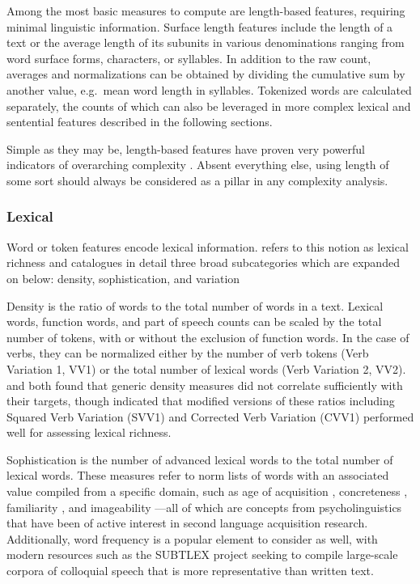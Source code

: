 Among the most basic measures to compute are length-based features, requiring minimal linguistic information. Surface length features include the length of a text or the average length of its subunits in various denominations ranging from word surface forms, characters, or syllables. In addition to the raw count, averages and normalizations can be obtained by dividing the cumulative sum by another value, e.g.\ mean word length in syllables. Tokenized words are calculated separately, the counts of which can also be leveraged in more complex lexical and sentential features described in the following sections.

Simple as they may be, length-based features have proven very powerful indicators of overarching complexity \citep{norris2009, bulte2012}. Absent everything else, using length of some sort should always be considered as a pillar in any complexity analysis.

\subsubsection{Lexical}
\label{section:lexical}

Word or token features encode lexical information.  refers to this notion as lexical richness and catalogues in detail three broad subcategories which are expanded on below: density, sophistication, and variation

Density is the ratio of words to the total number of words in a text. Lexical words, function words, and part of speech counts can be scaled by the total number of tokens, with or without the exclusion of function words. In the case of verbs, they can be normalized either by the number of verb tokens (Verb Variation 1, VV1) or the total number of lexical words (Verb Variation 2, VV2).  and \cite{lu2012} both found that generic density measures did not correlate sufficiently with their targets, though \cite{lu2012} indicated that modified versions of these ratios including Squared Verb Variation (SVV1) and Corrected Verb Variation (CVV1) performed well for assessing lexical richness.

Sophistication is the number of advanced lexical words to the total number of lexical words. These measures refer to norm lists of words with an associated value compiled from a specific domain, such as age of acquisition \citep{aoa}, concreteness \citep{paivio}, familiarity \citep{familiarity}, and imageability \citep{paivio}—all of which are concepts from psycholinguistics that have been of active interest in second language acquisition research. Additionally, word frequency is a popular element to consider as well, with modern resources such as the SUBTLEX project \citep{new2007, subtlex} seeking to compile large-scale corpora of colloquial speech that is more representative than written text.

